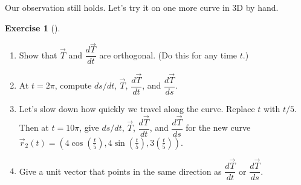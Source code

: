 \documentclass[10pt,]{book}
\theoremstyle{plain}
\theoremstyle{definition}
\theoremstyle{definition}
\theoremstyle{definition}
\theoremstyle{definition}
\newtheorem{exploration}[project]{Exercise}
\theoremstyle{definition}
\numberwithin{equation}{section}
\begin{document}
Our observation still holds. Let's try it on one more curve in 3D by hand.%
\begin{exploration}[]\label{exploration-175}
\leavevmode%
\begin{enumerate}[font=\bfseries,label=(\alph*),ref=\alph*]
\item\label{task-428} Show that \(\vec T\) and \(\dfrac{d\vec T}{dt}\) are orthogonal. (Do this for any time \(t\).)%
\item\label{task-429} At \(t=2\pi\), compute \(ds/dt\), \(\vec T\), \(\dfrac{d\vec T}{dt}\), and \(\dfrac{d\vec T}{ds}\).%
\item\label{task-430} Let's slow down how quickly we travel along the curve.  Replace \(t\) with \(t/5\).  Then at \(t=10\pi\), give \(ds/dt\), \(\vec T\), \(\dfrac{d\vec T}{dt}\), and \(\dfrac{d\vec T}{ds}\) for the new curve \(\vec r_2(t) =(4\cos(\frac{t}{5}),4\sin(\frac{t}{5}), 3(\frac{t}{5}))\).%
\item\label{task-431} Give a unit vector that points in the same direction as \(\dfrac{d\vec T}{dt}\) or \(\dfrac{d\vec T}{ds}\).%
\end{enumerate}
\end{exploration}
\typeout{************************************************}
\typeout{************************************************}
\end{document}
